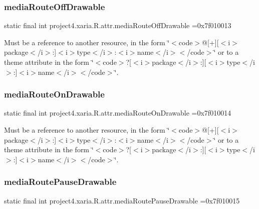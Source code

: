 \subsubsection{\texorpdfstring{media\+Route\+Off\+Drawable}{mediaRouteOffDrawable}}
{\footnotesize\ttfamily static final int project4.\+xaria.\+R.\+attr.\+media\+Route\+Off\+Drawable =0x7f010013\hspace{0.3cm}{\ttfamily [static]}}

Must be a reference to another resource, in the form \char`\"{}$<$code$>$@\mbox{[}+\mbox{]}\mbox{[}$<$i$>$package$<$/i$>$\+:\mbox{]}$<$i$>$type$<$/i$>$\+:$<$i$>$name$<$/i$>$$<$/code$>$\char`\"{} or to a theme attribute in the form \char`\"{}$<$code$>$?\mbox{[}$<$i$>$package$<$/i$>$\+:\mbox{]}\mbox{[}$<$i$>$type$<$/i$>$\+:\mbox{]}$<$i$>$name$<$/i$>$$<$/code$>$\char`\"{}. \mbox{\label{classproject4_1_1xaria_1_1R_1_1attr_af04bebb7f3209cc8805f88938c2fc85f}} 
\subsubsection{\texorpdfstring{media\+Route\+On\+Drawable}{mediaRouteOnDrawable}}
{\footnotesize\ttfamily static final int project4.\+xaria.\+R.\+attr.\+media\+Route\+On\+Drawable =0x7f010014\hspace{0.3cm}{\ttfamily [static]}}

Must be a reference to another resource, in the form \char`\"{}$<$code$>$@\mbox{[}+\mbox{]}\mbox{[}$<$i$>$package$<$/i$>$\+:\mbox{]}$<$i$>$type$<$/i$>$\+:$<$i$>$name$<$/i$>$$<$/code$>$\char`\"{} or to a theme attribute in the form \char`\"{}$<$code$>$?\mbox{[}$<$i$>$package$<$/i$>$\+:\mbox{]}\mbox{[}$<$i$>$type$<$/i$>$\+:\mbox{]}$<$i$>$name$<$/i$>$$<$/code$>$\char`\"{}. \mbox{\label{classproject4_1_1xaria_1_1R_1_1attr_a141c8ef0564545965a99299b3e53a5b1}} 
\subsubsection{\texorpdfstring{media\+Route\+Pause\+Drawable}{mediaRoutePauseDrawable}}
{\footnotesize\ttfamily static final int project4.\+xaria.\+R.\+attr.\+media\+Route\+Pause\+Drawable =0x7f010015\hspace{0.3cm}{\ttfamily [static]}}

